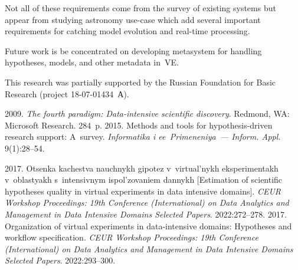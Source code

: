 \begin{multicols}{2}
      Not all of these requirements come from the survey of existing systems but 
appear from studying astronomy use-case which add several important requirements 
for catching model evolution and real-time processing.
      
      Future work is be concentrated on developing metasystem for handling 
hypotheses, models, and other metadata in~VE.
      
\vspace*{-9pt}

\Ack

\vspace*{-2pt}

\noindent
This research was partially supported by the Russian Foundation for Basic 
Research (project 18-07-01434~А).



\renewcommand{\bibname}{\protect\rmfamily References}



{\small\frenchspacing
{ %
\begin{thebibliography}{99}

\vspace*{-6pt}

 2009. \textit{The fourth paradigm: 
Data-intensive  scientific discovery}. Redmond, WA: Microsoft Research. 284~p.
 2015. Methods and tools for 
hypothesis-driven research support: A~survey. \textit{Informatika i ee~Primeneniya~--- Inform. 
Appl.}  9(1):28--54.

 2017. Otsenka kachestva nauchnykh gipotez v~virtual'nykh 
eksperimentakh v~oblastyakh s~intensivnym ispol'zovaniem dannykh [Estimation of scientific 
hypotheses quality in virtual experiments in data intensive domains]. \textit{CEUR Workshop 
Proceedings: 19th Conference (International) on Data Analytics and 
Management in Data Intensive Domains Selected Papers}. 2022:272--278.
2017. Organization of virtual experiments in data-intensive domains: Hypotheses and workflow 
specification. \textit{CEUR Workshop Proceedings:  19th Conference 
(International) on Data Analytics and Management in Data Intensive Domains
Selected Papers}. 2022:293--300.


\end{thebibliography}}}
\end{multicols}
